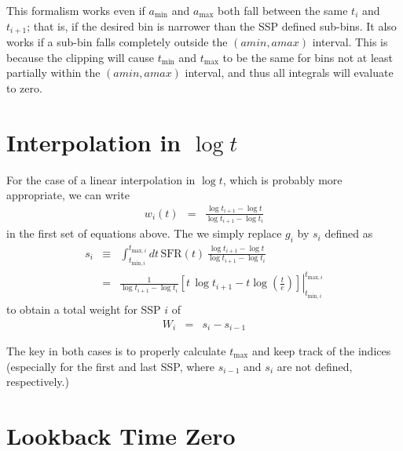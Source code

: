 \documentclass[12pt, letterpaper, preprint]{aastex}
\newcommand{\tmin}[1][]{t_{\mathrm{min} #1}}
\newcommand{\tmax}[1][]{t_{\mathrm{max} #1}}
\newcommand{\amin}{a_{\mathrm{min}}}
\newcommand{\amax} {a_{\mathrm{max}}}
\newcommand{\tintegral}{\int_{\tmin[,i]}^{\tmax[,i]} dt}
\newcommand{\tinterval}{\right|_{\tmin[,i]}^{\tmax[,i]}}
\begin{document}
This formalism works even if $\amin$ and $\amax$ both fall between the same $t_i$ and $t_{i+1}$; that is, if the desired bin is narrower than the SSP defined sub-bins.
It also works if a sub-bin falls completely outside the $(amin, amax)$ interval.
This is because the clipping will cause $\tmin$ and $\tmax$ to be the same for bins not at least partially within the $(amin, amax)$ interval, and thus all integrals will evaluate to zero.

\section{Interpolation in $\log t$}

For the case of a linear interpolation in $\log t$, which is probably more appropriate, we can write
\begin{eqnarray}
w_{i}(t) & = & \frac{ \log t_{i+1} - \log t}{ \log t_{i+1}  - \log t_i} \nonumber
\end{eqnarray}
in the first set of equations above. The we simply replace $g_i$ by $s_i$ defined as 
\begin{eqnarray}
s_i & \equiv & \tintegral \, \mathrm{SFR}(t) \, \frac{\log t_{i+1} - \log t}{\log t_{i+1}  - \log t_i} \nonumber \\
 & = & \left. \frac{1}{\log t_{i+1} - \log t_i} \left[ t \, \log t_{i+1} - t \log\left(\frac{t}{e}\right) \right] \tinterval
\end{eqnarray}
to obtain a total weight for SSP $i$ of
\begin{eqnarray}
W_i & = & s_{i} - s_{i-1} \nonumber
\end{eqnarray}

The key in both cases is to properly calculate $\tmax$ and keep track of the indices 
(especially for the first and last SSP, where $s_{i-1}$ and $s_i$ are not defined, respectively.)  

\section{Lookback Time Zero}
\end{document}
